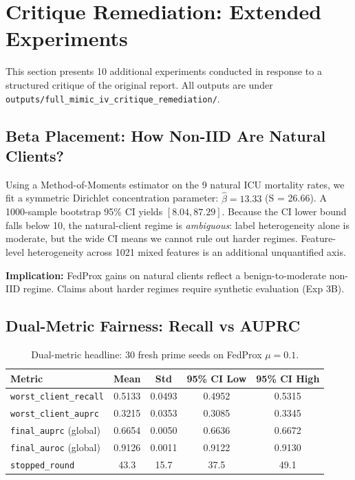 \section{Critique Remediation: Extended Experiments}
\label{sec:critique-remediation}

This section presents 10 additional experiments conducted in response to a structured critique of the original report. All outputs are under \texttt{outputs/full\_mimic\_iv\_critique\_remediation/}.

\subsection{Beta Placement: How Non-IID Are Natural Clients?}
\label{sec:beta-placement}

Using a Method-of-Moments estimator on the 9 natural ICU mortality rates, we fit a symmetric Dirichlet concentration parameter: $\hat{\beta} = 13.33$ (S = 26.66). A 1000-sample bootstrap 95\% CI yields $[8.04, 87.29]$. Because the CI lower bound falls below 10, the natural-client regime is \emph{ambiguous}: label heterogeneity alone is moderate, but the wide CI means we cannot rule out harder regimes. Feature-level heterogeneity across 1021 mixed features is an additional unquantified axis.

\textbf{Implication:} FedProx gains on natural clients reflect a benign-to-moderate non-IID regime. Claims about harder regimes require synthetic evaluation (Exp 3B).

\subsection{Dual-Metric Fairness: Recall vs AUPRC}
\label{sec:dual-metric}

\begin{table}[h]
\centering
\caption{Dual-metric headline: 30 fresh prime seeds on FedProx $\mu=0.1$.}
\label{tab:fresh-seeds-ci}
\begin{tabular}{lcccc}
\toprule
Metric & Mean & Std & 95\% CI Low & 95\% CI High \\
\midrule
\texttt{worst\_client\_recall} & 0.5133 & 0.0493 & 0.4952 & 0.5315 \\
\texttt{worst\_client\_auprc} & 0.3215 & 0.0353 & 0.3085 & 0.3345 \\
\texttt{final\_auprc} (global) & 0.6654 & 0.0050 & 0.6636 & 0.6672 \\
\texttt{final\_auroc} (global) & 0.9126 & 0.0011 & 0.9122 & 0.9130 \\
\texttt{stopped\_round} & 43.3 & 15.7 & 37.5 & 49.1 \\
\bottomrule
\end{tabular}
\end{table}

